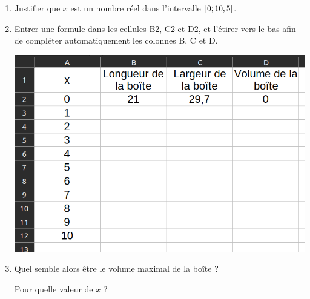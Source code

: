 \documentclass[
	classe=$1^{ere}STI2D$,
	headerTitle=Informatique
]{exercice}
\begin{document}
\begin{enumerate}
	\item Justifier que $x$ est un nombre réel dans l'intervalle $\left[ 0;10,5\right]$.
	\item Entrer une formule dans les cellules B2, C2 et D2, et l'étirer vers le bas afin de compléter automatiquement les colonnes B, C et D.

	      \begin{center}
		      \includegraphics[width=0.5\linewidth]{Activité - tableur (image 2).png}
	      \end{center}
	\item Quel semble alors être le volume maximal de la boîte ?

	      Pour quelle valeur de $x$ ?
\end{enumerate}
\end{document}
